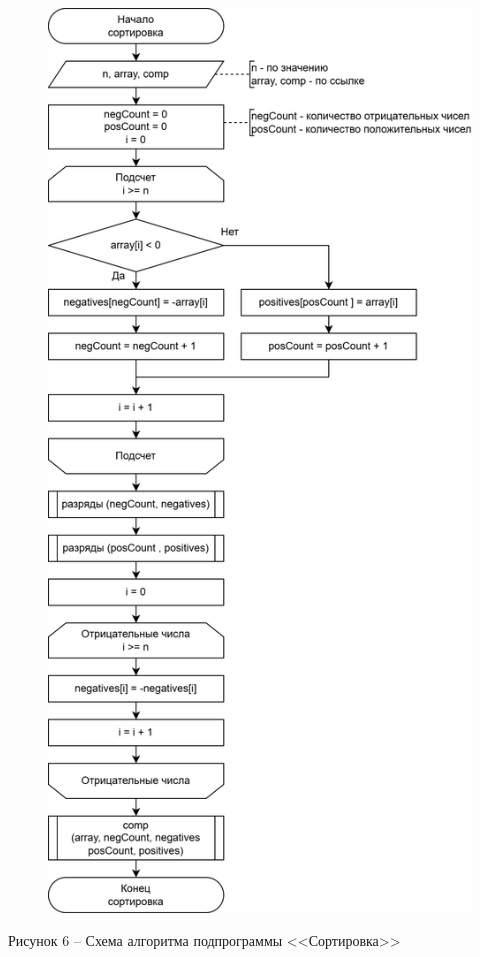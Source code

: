 \documentclass[a4paper,14pt]{extarticle}
\begin{document}
	\pagebreak
	\begin{figure}[h]
		\centering
		\includegraphics[width=0.55\linewidth]{images/s-2-2}
	\end{figure}
	\begin{center}
		Рисунок 6 – Схема алгоритма подпрограммы <<Сортировка>>
	\end{center}
\end{document}
